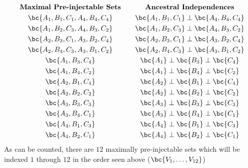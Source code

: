 \documentclass[aps, 10pt, english, twoside, pra, nofootinbib, longbibliography]{revtex4-1}
\theoremstyle{plain}
\theoremstyle{definition}
\theoremstyle{remark}
\newcommand{\ancestralindep}{\perp}
\begin{document}
    \begin{equation}
        \begin{gathered}
            \textbf{Maximal Pre-injectable Sets} \\
            \bc{A_1, B_1, C_1, A_4, B_4, C_4} \\
            \bc{A_1, B_2, C_3, A_4, B_3, C_2} \\
            \bc{A_2, B_3, C_1, A_3, B_2, C_4} \\
            \bc{A_2, B_4, C_3, A_3, B_1, C_2} \\
            \bc{A_1, B_3, C_4} \\
            \bc{A_1, B_4, C_2} \\
            \bc{A_2, B_1, C_4} \\
            \bc{A_2, B_2, C_2} \\
            \bc{A_3, B_3, C_3} \\
            \bc{A_3, B_4, C_1} \\
            \bc{A_4, B_1, C_3} \\
            \bc{A_4, B_2, C_1}
        \end{gathered}
        \qquad
        \begin{gathered}
            \textbf{Ancestral Independences} \\
            \bc{A_1, B_1, C_1} \ancestralindep \bc{A_4, B_4, C_4} \\
            \bc{A_1, B_2, C_3} \ancestralindep \bc{A_4, B_3, C_2} \\
            \bc{A_2, B_3, C_1} \ancestralindep \bc{A_3, B_2, C_4} \\
            \bc{A_2, B_4, C_3} \ancestralindep \bc{A_3, B_1, C_2} \\
            \bc{A_1} \ancestralindep \bc{B_3} \ancestralindep \bc{C_4} \\
            \bc{A_1} \ancestralindep \bc{B_4} \ancestralindep \bc{C_2} \\
            \bc{A_2} \ancestralindep \bc{B_1} \ancestralindep \bc{C_4} \\
            \bc{A_2} \ancestralindep \bc{B_2} \ancestralindep \bc{C_2} \\
            \bc{A_3} \ancestralindep \bc{B_3} \ancestralindep \bc{C_3} \\
            \bc{A_3} \ancestralindep \bc{B_4} \ancestralindep \bc{C_1} \\
            \bc{A_4} \ancestralindep \bc{B_1} \ancestralindep \bc{C_3} \\
            \bc{A_4} \ancestralindep \bc{B_2} \ancestralindep \bc{C_1}
        \end{gathered}
    \end{equation}
    As can be counted, there are $12$ maximally pre-injectable sets which will be indexed $1$ through $12$ in the order seen above ($\bc{V_1, \ldots, V_{12}}$)
\end{document}

